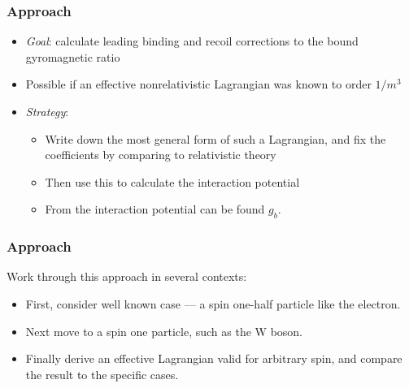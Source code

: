 \documentclass[11ppt]{beamer}
\begin{document}
\begin{frame}
\frametitle{Approach}

\begin{itemize}

\item	\emph{Goal}: calculate leading binding and recoil corrections to the bound gyromagnetic ratio

\item 	Possible if an effective nonrelativistic Lagrangian was known to order $1/m^3$

\item 	\emph{Strategy}: 
\begin{itemize}
  	\item 	Write down the most general form of such a Lagrangian, and fix the coefficients by comparing to relativistic theory
	\item 	Then use this to calculate the interaction potential
	\item 	From the interaction potential can be found $g_b$.
\end{itemize}
\end{itemize}

\end{frame}

\begin{frame}
\frametitle{Approach}
Work through this approach in several contexts:
\begin{itemize}
\item<1->	First, consider well known case --- a spin one-half particle like the electron.

\item<2-> 	Next move to a spin one particle, such as the W boson.

\item<3-> 	Finally derive an effective Lagrangian valid for arbitrary spin, and compare the result to the specific cases.

\end{itemize}

\vspace{2em}

\end{frame}
\end{document}
